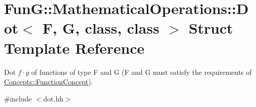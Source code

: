 \hypertarget{structFunG_1_1MathematicalOperations_1_1Dot}{\section{\-Fun\-G\-:\-:\-Mathematical\-Operations\-:\-:\-Dot$<$ \-F, \-G, class, class $>$ \-Struct \-Template \-Reference}
\label{structFunG_1_1MathematicalOperations_1_1Dot}
}


\-Dot $f \cdot g$ of functions of type \-F and \-G (\-F and \-G must satisfy the requirements of \hyperlink{structFunG_1_1Concepts_1_1FunctionConcept}{\-Concepts\-::\-Function\-Concept}).  




{\ttfamily \#include $<$dot.\-hh$>$}

